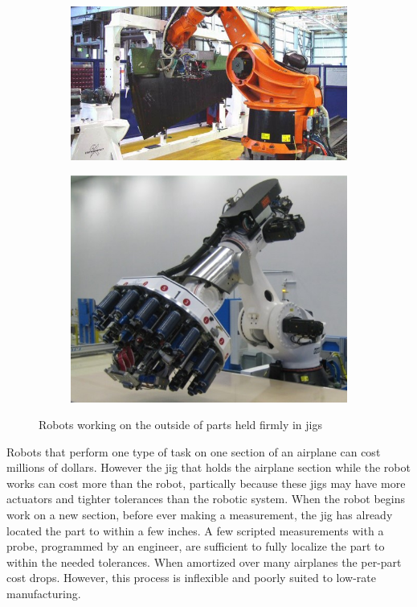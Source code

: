 \documentclass[../thesis.tex]{subfiles}
\begin{document}
\begin{figure}
  \centering
  \begin{subfigure}[b]{0.586\linewidth}
    \includegraphics[width=\linewidth]{./Introduction/Robot1Outside.jpg}    
  \end{subfigure}
  \hfill
  \begin{subfigure}[b]{0.4\linewidth}
    \includegraphics[width=\linewidth]{./Introduction/Robot2Outside.jpg}    
  \end{subfigure}
  \label{fig:KukaRobots}
  \caption{Robots working on the outside of parts held firmly in jigs}
\end{figure}

Robots that perform one type of task on one section of an airplane can cost millions of dollars.
However the jig that holds the airplane section while the robot works can cost more than the robot, partically because these jigs may have more actuators and tighter tolerances than the robotic system.
When the robot begins work on a new section, before ever making a measurement, the jig has already located the part to within a few inches.
A few scripted measurements with a probe, programmed by an engineer, are sufficient to fully localize the part to within the needed tolerances.
When amortized over many airplanes the per-part cost drops.
However, this process is inflexible and poorly suited to low-rate manufacturing.
\end{document}
